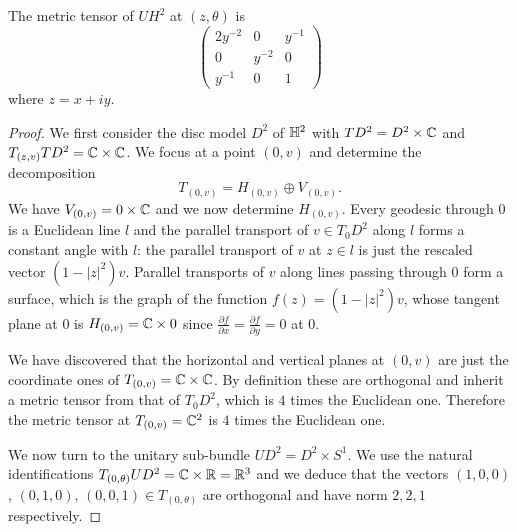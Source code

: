 \begin{lemma} \label{UH2:tensor:lemma}
The metric tensor of $UH^2$ at $(z,\theta)$ is
$$
\begin{pmatrix}
2y^{-2} & 0 & y^{-1} \\
0 & y^{-2} & 0 \\
y^{-1} & 0 & 1 
\end{pmatrix}
$$
where $z=x+iy$.
\end{lemma}
\begin{proof}
We first consider the disc model $D^2$ of $\mathbb{H}^2$ with $TD^2 = D^2 \times \mathbb{C}$ and $T_{(z,v)} TD^2 = \mathbb{C} \times \mathbb{C}$.  
We focus at a point $(0,v)$ and determine the decomposition 
$$T_{(0,v)} = H_{(0,v)} \oplus V_{(0,v)}.$$ 
We have $V_{(0,v)} = 0 \times \mathbb{C}$ and we now determine $H_{(0,v)}$. Every geodesic through $0$ is a Euclidean line $l$ and the parallel transport of $v\in T_0D^2$ along $l$ forms a constant angle with $l$: the parallel transport of $v$ at $z\in l$ is just the rescaled vector $(1-|z|^2)v$. Parallel transports of $v$ along lines passing through $0$ form a surface, which is the graph of the function $f(z) = (1-|z|^2)v$, whose tangent plane at $0$ is $H_{(0,v)} = \mathbb{C} \times 0$ since $\frac{\partial f}{\partial x} = \frac{\partial f}{\partial y} = 0$ at $0$.

We have discovered that the horizontal and vertical planes at $(0,v)$ are just the coordinate ones of $T_{(0,v)} = \mathbb{C} \times \mathbb{C}$. By definition these are orthogonal and inherit a metric tensor from that of $T_0D^2$, which is $4$ times the Euclidean one. Therefore the metric tensor at $T_{(0,v)} = \mathbb{C}^2$ is $4$ times the Euclidean one. 

We now turn to the unitary sub-bundle $UD^2 = D^2 \times S^1$. We use the natural identifications $T_{(0,\theta)} UD^2 = \mathbb{C} \times \mathbb{R} = \mathbb{R}^3$ and we deduce that the vectors $(1,0,0)$, $(0,1,0)$, $(0,0,1) \in T_{(0,\theta)}$ are orthogonal and have norm $2,2,1$ respectively. 


\end{proof}
